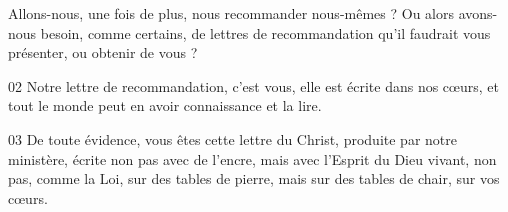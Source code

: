 Allons-nous, une fois de plus, nous recommander nous-mêmes ? Ou alors avons-nous besoin, comme certains, de lettres de recommandation qu’il faudrait vous présenter, ou obtenir de vous ?

02 Notre lettre de recommandation, c’est vous, elle est écrite dans nos cœurs, et tout le monde peut en avoir connaissance et la lire.

03 De toute évidence, vous êtes cette lettre du Christ, produite par notre ministère, écrite non pas avec de l’encre, mais avec l’Esprit du Dieu vivant, non pas, comme la Loi, sur des tables de pierre, mais sur des tables de chair, sur vos cœurs.
